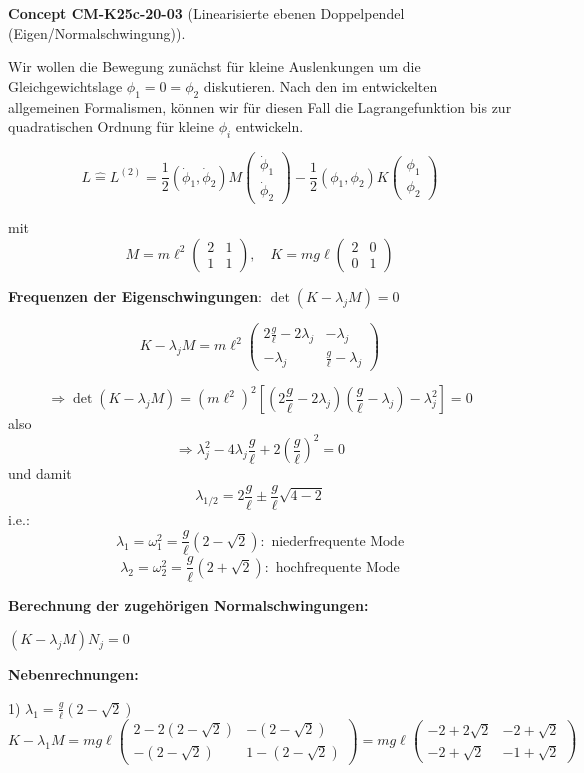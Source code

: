 \documentclass[10pt, letterpaper]{article}
\newcommand{\CustomHeading}[3]{%
  \par\medskip\noindent%
  \textbf{#1 #2} \textnormal{(#3)}.\enskip%
}
\newenvironment{CONC}[2]{\CustomHeading{Concept}{#1}{#2}}{}
\begin{document}
\begin{CONC}{CM-K25c-20-03}{Linearisierte ebenen Doppelpendel (Eigen/Normalschwingung)}
Wir wollen die Bewegung zunächst für kleine Auslenkungen um die Gleichgewichtslage $\phi_1=0=\phi_2$ diskutieren. Nach den im entwickelten allgemeinen Formalismen, können wir für diesen Fall die Lagrangefunktion bis zur quadratischen Ordnung für kleine $\phi_i$ entwickeln.

\[L \hat{=} L^{(2)} = \frac{1}{2}(\dot{\phi}_1, \dot{\phi}_2)M\begin{pmatrix}\dot{\phi}_1 \\ \dot{\phi}_2\end{pmatrix} - \frac{1}{2}(\phi_1, \phi_2)K\begin{pmatrix}\phi_1 \\ \phi_2\end{pmatrix}\]

mit \[M = m\ell^2\begin{pmatrix}2 & 1 \\ 1 & 1\end{pmatrix}, \quad K = mg\ell\begin{pmatrix}2 & 0 \\ 0 & 1\end{pmatrix}\]

\textbf{Frequenzen der Eigenschwingungen}: $\det(K-\lambda_j M)=0$

\[K-\lambda_j M = m\ell^2\begin{pmatrix}2\frac{g}{\ell}-2\lambda_j & -\lambda_j \\ -\lambda_j & \frac{g}{\ell}-\lambda_j\end{pmatrix}\]

\[\Rightarrow \det(K-\lambda_j M) = (m\ell^2)^2[(2\frac{g}{\ell}-2\lambda_j)(\frac{g}{\ell}-\lambda_j)-\lambda_j^2] = 0\]
also
\[\Rightarrow \lambda_j^2 - 4\lambda_j\frac{g}{\ell} + 2\left(\frac{g}{\ell}\right)^2 = 0\]
und damit
\[ \lambda_{1/2} = 2\frac{g}{\ell} \pm \frac{g}{\ell}\sqrt{4-2}\]
i.e.:
\[\lambda_1 = \omega_1^2 = \frac{g}{\ell}(2-\sqrt{2}): \text{ niederfrequente Mode}\]
\[\lambda_2 = \omega_2^2 = \frac{g}{\ell}(2+\sqrt{2}): \text{ hochfrequente Mode}\]

\noindent\textbf{Berechnung der zugehörigen Normalschwingungen:}

$(K-\lambda_j M)N_j = 0$

\noindent\textbf{Nebenrechnungen:}

1) $\lambda_1 = \frac{g}{\ell}(2-\sqrt{2})$
\[K-\lambda_1 M = mg\ell\begin{pmatrix}2-2(2-\sqrt{2}) & -(2-\sqrt{2}) \\ -(2-\sqrt{2}) & 1-(2-\sqrt{2})\end{pmatrix} = mg\ell\begin{pmatrix}-2+2\sqrt{2} & -2+\sqrt{2} \\ -2+\sqrt{2} & -1+\sqrt{2}\end{pmatrix}\]


\end{CONC}
\end{document}
